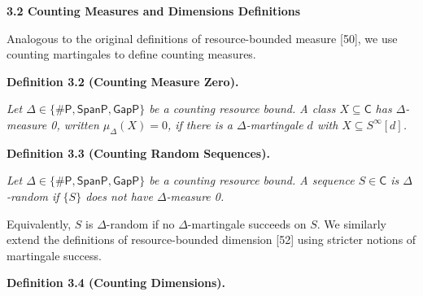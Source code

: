



\par\medskip\noindent\textbf{
3.2 Counting Measures and Dimensions Definitions}\par




Analogous to the original definitions of resource-bounded measure [50], we use counting martingales to define counting measures.\par





\par\medskip\noindent\textbf{
\textbf{Definition 3.2}\textbf{ }(Counting Measure Zero)\textbf{.}
}\par



\emph{Let $\Delta\in\{{\mathsf{\#}\mathsf{P}},\mathsf{SpanP},\mathsf{GapP}\}$ be a counting resource bound.
A class $X\subseteq\mathsf{C}$ has $\Delta$-measure 0, written $\mu_{\Delta}(X)=0$, if there is a $\Delta$-martingale $d$ with $X\subseteq S^{\infty}[d]$.}\par







\par\medskip\noindent\textbf{
\textbf{Definition 3.3}\textbf{ }(Counting Random Sequences)\textbf{.}
}\par



\emph{Let $\Delta\in\{{\mathsf{\#}\mathsf{P}},\mathsf{SpanP},\mathsf{GapP}\}$ be a counting resource bound.
A sequence $S\in\mathsf{C}$ is $\Delta$-random if $\{S\}$ does not have $\Delta$-measure 0.}\par






Equivalently, $S$ is $\Delta$-random if no $\Delta$-martingale succeeds on $S$.
We similarly extend the definitions of resource-bounded dimension [52] using stricter notions of martingale success.\par





\par\medskip\noindent\textbf{
\textbf{Definition 3.4}\textbf{ }(Counting Dimensions)\textbf{.}
}\par



